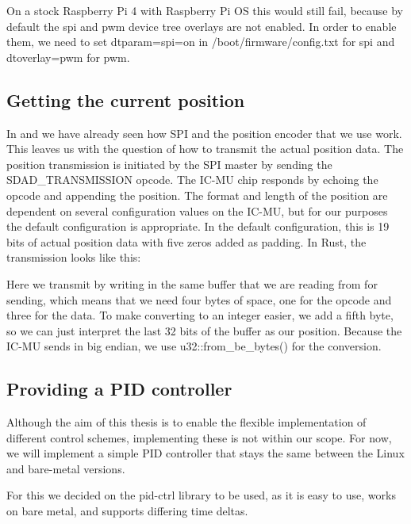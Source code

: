 

On a stock Raspberry Pi 4 with Raspberry Pi OS this would still fail, because by default the spi and pwm device tree overlays are not enabled.
In order to enable them, we need to set dtparam=spi=on in /boot/firmware/config.txt for spi and dtoverlay=pwm for pwm.

\subsection{Getting the current position}

In  and  we have already seen how SPI and the position encoder that we use work.
This leaves us with the question of how to transmit the actual position data.
The position transmission is initiated by the SPI master by sending the SDAD\_TRANSMISSION opcode.
The IC-MU chip responds by echoing the opcode and appending the position.
The format and length of the position are dependent on several configuration values on the IC-MU, but for our purposes the default configuration is appropriate.
In the default configuration, this is 19 bits of actual position data with five zeros added as padding.
In Rust, the transmission looks like this:



Here we transmit by writing in the same buffer that we are reading from for sending, which means that we need four bytes of space, one for the opcode and three for the data.
To make converting to an integer easier, we add a fifth byte, so we can just interpret the last 32 bits of the buffer as our position.
Because the IC-MU sends in big endian, we use u32::from\_be\_bytes() for the conversion.

\subsection{Providing a PID controller}

Although the aim of this thesis is to enable the flexible implementation of different control schemes, implementing these is not within our scope.
For now, we will implement a simple PID controller that stays the same between the Linux and bare-metal versions.

For this we decided on the pid-ctrl library to be used, as it is easy to use, works on bare metal, and supports differing time deltas.

